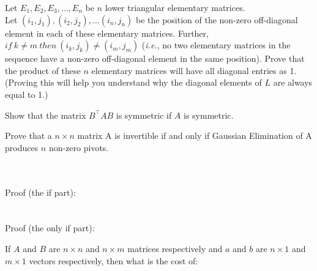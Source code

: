 \documentclass[solution,addpoints,12pt]{exam}
\begin{document}
\begin{questions}
\begin{solution}

\end{solution}

\question[1] 
Let $E_1, E_2, E_3, \dots, E_n$ be $n$ lower triangular  elementary matrices.\\Let $(i_1, j_1), (i_2, j_2), \dots (i_n, j_n)$ be the position of the non-zero off-diagonal element in each of these elementary matrices. Further, $if~k \neq m~then~(i_k, j_k) \neq (i_m, j_m)$ (\textit{i.e.}, no two elementary matrices in the sequence have a non-zero off-diagonal element in the same position). Prove that the product of these $n$ elementary matrices will have all diagonal entries as 1. (Proving this will help you understand why the diagonal elements of $L$ are always equal to 1.)
\begin{solution}

\end{solution}

\question[\half] 
Show that the matrix $B^{\top}AB$ is symmetric if $A$ is symmetric.
\begin{solution}

\end{solution}

\question[2] Prove that a $n \times n$ matrix A is invertible if and only if Gaussian Elimination of A produces $n$ non-zero pivots. 
\begin{solution}
~\\~\\
Proof (the if part): \\
~\\~\\
Proof (the only if part): \\
\end{solution}

\question[1 \half] 

If $A$ and $B$ are $n\times n$ and $n\times m$ matrices respectively and $a$ and $b$ are $n\times 1$ and $m\times 1$ vectors respectively, then what is the cost of:
\end{questions}
\end{document}
